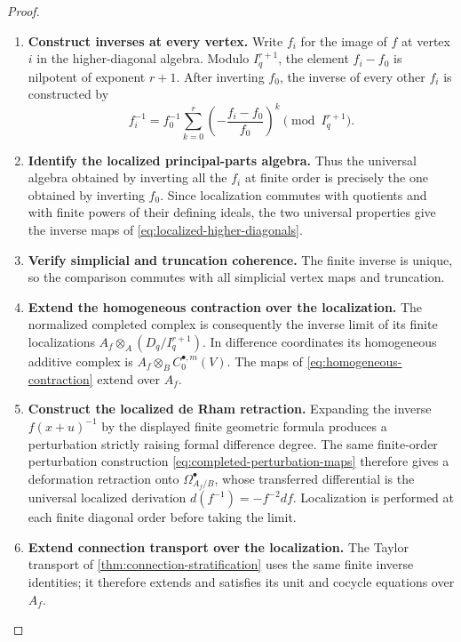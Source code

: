 \documentclass[11pt,a4paper]{article}
\numberwithin{algorithm}{section}
\numberwithin{equation}{section}
\theoremstyle{definition}
\theoremstyle{remark}
\theoremstyle{plain}
\theoremstyle{definition}
\theoremstyle{plain}
\begin{document}
\begin{proof}\leavevmode
\begin{enumerate}[leftmargin=*,align=left]
\item \textbf{Construct inverses at every vertex.}
Write $f_i$ for the image of $f$ at vertex $i$ in the
higher-diagonal algebra.  Modulo $I_q^{r+1}$, the element
$f_i-f_0$ is nilpotent of exponent $r+1$.  After inverting
$f_0$, the inverse of every other $f_i$ is constructed by
\[
 f_i^{-1}=f_0^{-1}\sum_{k=0}^r
  \left(-\frac{f_i-f_0}{f_0}\right)^k
  \pmod{I_q^{r+1}}.
\]

\item \textbf{Identify the localized principal-parts algebra.}
Thus the universal algebra obtained by inverting all the
$f_i$ at finite order is precisely the one obtained by
inverting $f_0$.  Since localization commutes with quotients
and with finite powers of their defining ideals, the two
universal properties give the inverse maps of
\eqref{eq:localized-higher-diagonals}.

\item \textbf{Verify simplicial and truncation coherence.}
The finite inverse
is unique, so the comparison commutes with all simplicial
vertex maps and truncation.

\item \textbf{Extend the homogeneous contraction over the localization.}
The normalized completed complex is consequently the inverse
limit of its finite localizations
$A_f\otimes_A(D_q/I_q^{r+1})$.  In difference coordinates its
homogeneous additive complex is
$A_f\otimes_B C^{\bullet,m}_0(V)$.  The maps of
\cref{eq:homogeneous-contraction} extend over $A_f$.

\item \textbf{Construct the localized de Rham retraction.}
Expanding the inverse $f(x+u)^{-1}$ by the displayed finite
geometric formula produces a perturbation strictly raising
formal difference degree.  The same finite-order perturbation
construction \eqref{eq:completed-perturbation-maps} therefore
gives a deformation retraction onto
$\Omega^\bullet_{A_f/B}$, whose transferred differential is
the universal localized derivation
$d(f^{-1})=-f^{-2}df$.  Localization is performed at each finite diagonal order before taking the limit.

\item \textbf{Extend connection transport over the localization.}
The Taylor transport of \cref{thm:connection-stratification}
uses the same finite inverse identities; it therefore extends
and satisfies its unit and cocycle equations over $A_f$.
\end{enumerate}
\end{proof}
\end{document}
